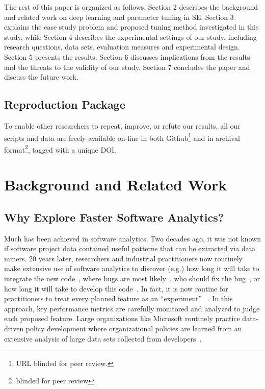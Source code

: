 \documentclass[sigconf,review, anonymous]{acmart}
\theoremstyle{break}
\begin{document}
The rest of this paper is organized as follows. Section 2 describes the background and related work on deep learning and parameter tuning in SE. Section 3 explains the case study problem and proposed tuning method investigated in this study, while Section 4 describes the
experimental settings of our study, including research questions, data sets, evaluation measures and experimental design.
Section 5 presents the results. Section 6 discusses implications from the results and the threats to the validity of our study. Section 7 concludes the paper and discuss the future work.
\subsection{Reproduction Package}
To enable other researchers to repeat, improve, or
refute our results, all our scripts and data are 
freely available on-line in both
Github\footnote{URL blinded for 
peer review.} and in archival format\footnote{blinded for peer review}, tagged with a unique DOI.



\section{Background and Related Work}

\subsection{Why Explore Faster Software Analytics?}
Much has been achieved in software analytics. Two decades ago, it was not known if software project data contained useful patterns that can be extracted via data miners. 20 years later, researchers and industrial practitioners now routinely make extensive use of software analytics to discover (e.g.) how long it will take to integrate the new code~\cite{czerwonka2011crane}, where bugs are most likely~\cite{ostrand2004bugs}, who should fix the bug~\cite{anvik2006should}, or how long it will take to develop this code~\cite{kocaguneli2012value,kocaguneli2012exploiting,molokken2003review}. In fact, it is now routine for practitioners to treat every planned feature as an ``experiment'' ~\cite{savor2016continuous}. In this approach, key performance metrics are carefully monitored and analyzed to judge each proposed feature. Large organizations like Microsoft routinely practice data-driven policy development where organizational policies are learned from an extensive analysis of large data sets collected from developers~\cite{begel2014analyze,theisen2015approximating}.
\end{document}
